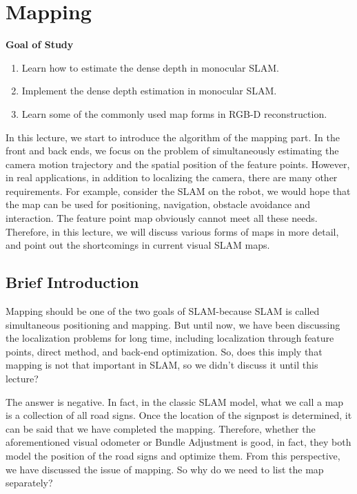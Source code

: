 \chapter{Mapping}
\label{cpt:12}
\begin{mdframed}  
	\textbf{Goal of Study}
	\begin{enumerate}[labelindent=0em,leftmargin=1.5em]
		\item Learn how to estimate the dense depth in monocular SLAM. 
		\item Implement the dense depth estimation in monocular SLAM.
		\item Learn some of the commonly used map forms in RGB-D reconstruction. 
	\end{enumerate}
\end{mdframed}

In this lecture, we start to introduce the algorithm of the mapping part. In the front and back ends, we focus on the problem of simultaneously estimating the camera motion trajectory and the spatial position of the feature points. However, in real applications, in addition to localizing the camera, there are many other requirements. For example, consider the SLAM on the robot, we would hope that the map can be used for positioning, navigation, obstacle avoidance and interaction. The feature point map obviously cannot meet all these needs. Therefore, in this lecture, we will discuss various forms of maps in more detail, and point out the shortcomings in current visual SLAM maps.

\newpage
\section{Brief Introduction}
Mapping should be one of the two goals of SLAM-because SLAM is called simultaneous positioning and mapping. But until now, we have been discussing the localization problems for long time, including localization through feature points, direct method, and back-end optimization. So, does this imply that mapping is not that important in SLAM, so we didn't discuss it until this lecture?

The answer is negative. In fact, in the classic SLAM model, what we call a map is a collection of all road signs. Once the location of the signpost is determined, it can be said that we have completed the mapping. Therefore, whether the aforementioned visual odometer or Bundle Adjustment is good, in fact, they both model the position of the road signs and optimize them. From this perspective, we have discussed the issue of mapping. So why do we need to list the map separately?

